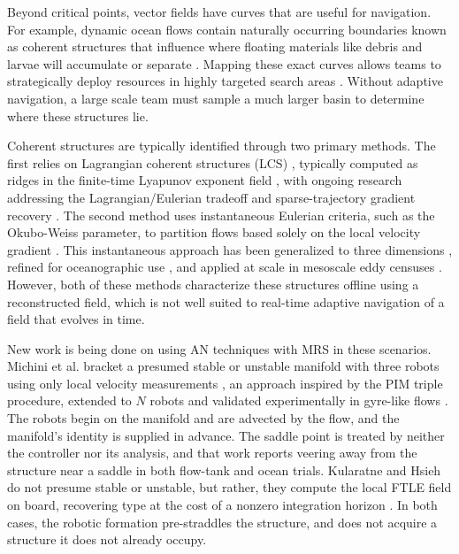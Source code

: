 \documentclass[lettersize,journal]{IEEEtran}
\begin{document}
Beyond critical points, vector fields have curves that are useful for navigation. For example, dynamic ocean flows contain naturally occurring boundaries known as coherent structures that influence where floating materials like debris and larvae will accumulate or separate \cite{9,10}. Mapping these exact curves allows teams to strategically deploy resources in highly targeted search areas \cite{11,12,13}. Without adaptive navigation, a large scale team must sample a much larger basin to determine where these structures lie.

Coherent structures are typically identified through two primary methods. The first relies on Lagrangian coherent structures (LCS) \cite{14}, typically computed as ridges in the finite-time Lyapunov exponent field \cite{15}, with ongoing research addressing the Lagrangian/Eulerian tradeoff and sparse-trajectory gradient recovery \cite{16,17,18,19,20}. The second method uses instantaneous Eulerian criteria, such as the Okubo-Weiss parameter, to partition flows based solely on the local velocity gradient \cite{21,22}. This instantaneous approach has been generalized to three dimensions \cite{23}, refined for oceanographic use \cite{24}, and applied at scale in mesoscale eddy censuses \cite{25}. However, both of these methods characterize these structures offline using a reconstructed field, which is not well suited to real-time adaptive navigation of a field that evolves in time.  

New work is being done on using AN techniques with MRS in these scenarios. Michini et al. bracket a presumed stable or
unstable manifold with three robots using only local velocity
measurements \cite{26}, an approach inspired by the PIM triple
procedure, extended to $N$ robots \cite{27} and validated
experimentally in gyre-like flows \cite{28,29}. The robots begin on the
manifold and are advected by the flow, and the manifold's identity is
supplied in advance. The saddle point is treated by neither the
controller nor its analysis, and that work reports veering away from
the structure near a saddle in both flow-tank and ocean trials. Kularatne and Hsieh do not presume stable or unstable, but rather, they compute the local FTLE field on board, recovering
type at the cost of a nonzero integration horizon \cite{30}. In both cases, the robotic formation pre-straddles the structure, and does not acquire a structure it does not already occupy.
\end{document}
